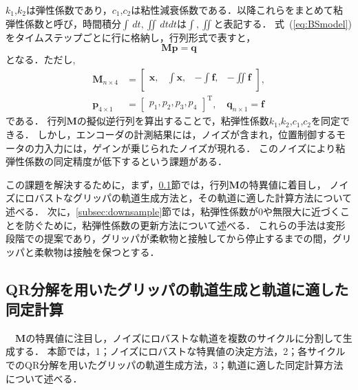 \documentclass[a4paper]{jarticle}
\begin{document}
$k_1$,$k_2$は弾性係数であり，$c_1$,$c_2$は粘性減衰係数である．以降これらをまとめて粘弾性係数と呼び，時間積分$\int \,dt, \iint \,dtdt $は$\int, \iint$と表記する．
式~(\ref{eq:BSmodel})をタイムステップごとに行に格納し，行列形式で表すと，
\begin{equation}
    \mathbf{M}\mathbf{p} = \mathbf{q} 
    \label{eq:Mp_q}
\end{equation}
となる．ただし,
\begin{equation}
    \begin{aligned}
        \mathbf{M}_{n \times 4} &= \begin{bmatrix}
            \boldsymbol{x}, & \int{\boldsymbol{x}}, & -\int{\boldsymbol{f}}, & -\iint{\boldsymbol{f}}\\
        \end{bmatrix}, \\
        \mathbf{p}_{4 \times 1}  &= \begin{bmatrix}
            p_1 ,p_2 ,p_3 ,p_4
        \end{bmatrix}^{\mathrm{T}}, \quad
        \mathbf{q}_{n \times 1}   = \boldsymbol{f}
    \end{aligned}
\label{eq:BSmodel_matrix}
\end{equation}
である．
行列$\mathbf{M}$の擬似逆行列を算出することで，粘弾性係数$k_1$,$k_2$,$c_1$,$c_2$を同定できる．
しかし，エンコーダの計測結果には，ノイズが含まれ，位置制御するモータの力入力には，ゲインが乗じられたノイズが現れる．
このノイズにより粘弾性係数の同定精度が低下するという課題がある．

この課題を解決するために，まず，\ref{subsec:QR_traj_and_calculation}節では，行列$\mathbf{M}$の特異値に着目し，
ノイズにロバストなグリッパの軌道生成方法と，その軌道に適した計算方法について述べる．
次に，\ref{subsec:downsample}節では，粘弾性係数が0や無限大に近づくことを防ぐために，粘弾性係数の更新方法について述べる．
これらの手法は変形段階での提案であり，グリッパが柔軟物と接触してから停止するまでの間，グリッパと柔軟物は接触を保つとする．
\subsection{QR分解を用いたグリッパの軌道生成と軌道に適した同定計算}\label{subsec:QR_traj_and_calculation}
　$\mathbf{M}$の特異値に注目し，ノイズにロバストな軌道を複数のサイクルに分割して生成する．
本節では，1；ノイズにロバストな特異値の決定方法，2；各サイクルでのQR分解を用いたグリッパの軌道生成方法，3；軌道に適した同定計算方法について述べる．
\end{document}
